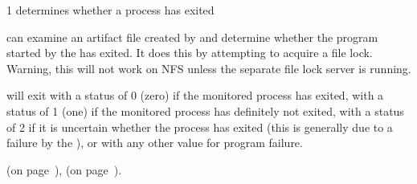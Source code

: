 \begin{ManPage}{\label{man-flock-undertaker}}{1}
{determines whether a process has exited}

\Synopsis {}


\Description
{} can examine an artifact file created by
 and determine whether the program started by
the  has exited.  It does this by attempting to acquire
a file lock.  Warning, this will not work on NFS unless the separate
file lock server is running.

\begin{Options}
\end{Options}

\ExitStatus 
{} will exit with a status of 0 (zero) if the
monitored process has exited, with a status of 1 (one) if the
monitored process has definitely not exited, with a status of 2 if it
is uncertain whether the process has exited (this is generally due to
a failure by the ), or with any other value
for program failure.

\SeeAlso
{} (on page~\pageref{man-uniq-pid-undertaker}),
 (on page~\pageref{man-flock-midwife}).

\end{ManPage}
